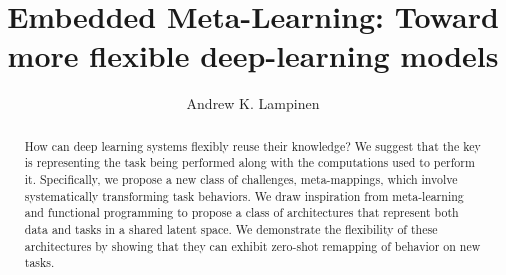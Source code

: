 \documentclass{article}
\begin{document}
\title{Embedded Meta-Learning: Toward more flexible deep-learning models}
\author{Andrew K. Lampinen}
\date{}
\maketitle

\begin{abstract}
How can deep learning systems flexibly reuse their knowledge? We suggest that the key is representing the task being performed along with the computations used to perform it. Specifically, we propose a new class of challenges, meta-mappings, which involve systematically transforming task behaviors. We draw inspiration from meta-learning and functional programming to propose a class of architectures that represent both data and tasks in a shared latent space. We demonstrate the flexibility of these architectures by showing that they can exhibit zero-shot remapping of behavior on new tasks. 
\end{abstract}
\end{document}
